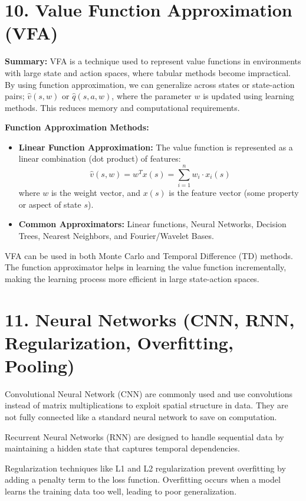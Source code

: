 \documentclass[a4paper,10pt]{article}
\begin{document}
\begin{multicols}{2}
\section*{10. Value Function Approximation (VFA)}
\textbf{Summary:} VFA is a technique used to represent value functions in environments with large state and action spaces, where tabular methods become impractical. By using function approximation, we can generalize across states or state-action pairs; \( \hat{v}(s,w) \) or \( \hat{q}(s,a,w) \), where the parameter \(w \) is updated using learning methods. This reduces memory and computational requirements.

\noindent \textbf{Function Approximation Methods:}
\begin{itemize}
    \item \textbf{Linear Function Approximation:} The value function is represented as a linear combination (dot product) of features:
    \[
    \hat{v}(s, w) = w^T x(s) = \sum_{i=1}^{n} w_i \cdot x_i(s)
    \]
    where \(w\) is the weight vector, and \(x(s)\) is the feature vector (some property or aspect of state \( s \)).
    \item \textbf{Common Approximators:} Linear functions, Neural Networks, Decision Trees, Nearest Neighbors, and Fourier/Wavelet Bases.
\end{itemize}

VFA can be used in both Monte Carlo and Temporal Difference (TD) methods. The function approximator helps in learning the value function incrementally, making the learning process more efficient in large state-action spaces.


\section*{11. Neural Networks (CNN, RNN, Regularization, Overfitting, Pooling)}
Convolutional Neural Network (CNN) are commonly used and use convolutions instead of matrix multiplications to exploit spatial structure in data. They are not fully connected like a standard neural network to save on computation.

\noindent Recurrent Neural Networks (RNN) are designed to handle sequential data by maintaining a hidden state that captures temporal dependencies.

\noindent Regularization techniques like L1 and L2 regularization prevent overfitting by adding a penalty term to the loss function. Overfitting occurs when a model learns the training data too well, leading to poor generalization.


\end{multicols}
\end{document}
